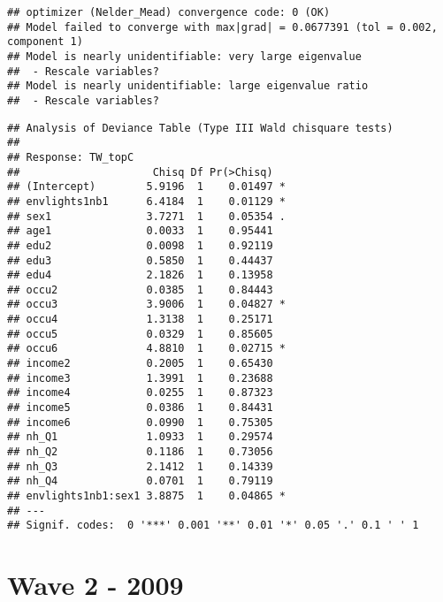\documentclass[
]{book}
\begin{document}
\begin{verbatim}
## optimizer (Nelder_Mead) convergence code: 0 (OK)
## Model failed to converge with max|grad| = 0.0677391 (tol = 0.002, component 1)
## Model is nearly unidentifiable: very large eigenvalue
##  - Rescale variables?
## Model is nearly unidentifiable: large eigenvalue ratio
##  - Rescale variables?
\end{verbatim}

\begin{verbatim}
## Analysis of Deviance Table (Type III Wald chisquare tests)
## 
## Response: TW_topC
##                     Chisq Df Pr(>Chisq)  
## (Intercept)        5.9196  1    0.01497 *
## envlights1nb1      6.4184  1    0.01129 *
## sex1               3.7271  1    0.05354 .
## age1               0.0033  1    0.95441  
## edu2               0.0098  1    0.92119  
## edu3               0.5850  1    0.44437  
## edu4               2.1826  1    0.13958  
## occu2              0.0385  1    0.84443  
## occu3              3.9006  1    0.04827 *
## occu4              1.3138  1    0.25171  
## occu5              0.0329  1    0.85605  
## occu6              4.8810  1    0.02715 *
## income2            0.2005  1    0.65430  
## income3            1.3991  1    0.23688  
## income4            0.0255  1    0.87323  
## income5            0.0386  1    0.84431  
## income6            0.0990  1    0.75305  
## nh_Q1              1.0933  1    0.29574  
## nh_Q2              0.1186  1    0.73056  
## nh_Q3              2.1412  1    0.14339  
## nh_Q4              0.0701  1    0.79119  
## envlights1nb1:sex1 3.8875  1    0.04865 *
## ---
## Signif. codes:  0 '***' 0.001 '**' 0.01 '*' 0.05 '.' 0.1 ' ' 1
\end{verbatim}

\hypertarget{wave-2---2009}{%
\section{Wave 2 - 2009}\label{wave-2---2009}}
\end{document}
